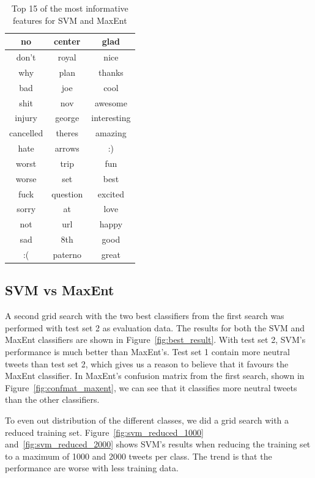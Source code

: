 \begin{table}[!htb]
\begin{minipage}{.45\linewidth}
\begin{tabular}{|c|c|c|}
		no 	& center & glad \\ \hline
		don't 	& royal & nice \\ \hline
		why 	& plan & thanks \\ \hline
		bad 	& joe & cool \\ \hline
		shit 	& nov & awesome \\ \hline
		injury 	& george & interesting \\ \hline
		cancelled 	& theres & amazing \\ \hline
		hate 	& arrows & :) \\ \hline
		worst 	& trip & fun \\ \hline
		worse 	& set & best \\ \hline
		fuck 	& question & excited \\ \hline
		sorry 	& at & love \\ \hline
		not 	& url & happy \\ \hline
		sad 	& 8th & good \\ \hline
		:( 	& paterno & great \\ \hline
		\end{tabular}
	\end{minipage}
	\caption[Most informative features]{Top 15 of the most informative features for SVM and MaxEnt}
	\label{tab:informative_features}
\end{table}



\subsection{SVM vs MaxEnt}
A second grid search with the two best classifiers from the first search was performed with test set 2 as evaluation data. The results for both the SVM and MaxEnt classifiers are shown in Figure~\ref{fig:best_result}. With test set 2, SVM's performance is much better than MaxEnt's. Test set 1 contain more neutral tweets than test set 2, which gives us a reason to believe that it favours the MaxEnt classifier. In MaxEnt's confusion matrix from the first search, shown in Figure~\ref{fig:confmat_maxent}, we can see that it classifies more neutral tweets than the other classifiers.

To even out distribution of the different classes, we did a grid search with a reduced training set. Figure~\ref{fig:svm_reduced_1000} and~\ref{fig:svm_reduced_2000} shows SVM's results when reducing the training set to a maximum of 1000 and 2000 tweets per class. The trend is that the performance are worse with less training data.

